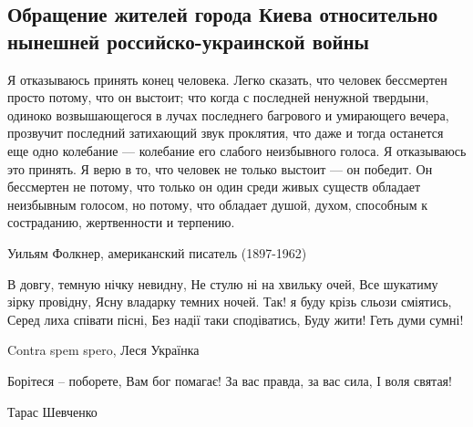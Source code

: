  
 
 
 
 

\subsection{Обращение жителей города Киева относительно нынешней российско-украинской войны}
\label{sec:moje.prizyv.my}

\begin{zzquote}
Я отказываюсь принять конец человека. Легко сказать, что человек бессмертен
просто потому, что он выстоит; что когда с последней ненужной твердыни, одиноко
возвышающегося в лучах последнего багрового и умирающего вечера, прозвучит
последний затихающий звук проклятия, что даже и тогда останется еще одно
колебание — колебание его слабого неизбывного голоса. Я отказываюсь это
принять. Я верю в то, что человек не только выстоит — он победит. Он бессмертен
не потому, что только он один среди живых существ обладает неизбывным голосом,
но потому, что обладает душой, духом, способным к состраданию, жертвенности и
терпению.

Уильям Фолкнер, американский писатель (1897-1962)

В довгу, темную нічку невидну, Не стулю ні на хвильку очей,
Все шукатиму зірку провідну, Ясну владарку темних ночей.
Так! я буду крізь сльози сміятись, Серед лиха співати пісні,
Без надії таки сподіватись, Буду жити! Геть думи сумні! 

Contra spem spero, Леся Українка

Борітеся – поборете, Вам бог помагає! За вас правда, за вас сила, І воля святая!

Тарас Шевченко
\end{zzquote}



